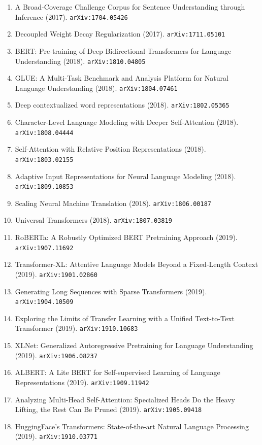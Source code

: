 \documentclass[11pt]{article}
\begin{document}
\begin{enumerate}
  \item A Broad-Coverage Challenge Corpus for Sentence Understanding through
  Inference (2017). \texttt{arXiv:1704.05426}
  \item Decoupled Weight Decay Regularization (2017). \texttt{arXiv:1711.05101}
  \item BERT: Pre-training of Deep Bidirectional Transformers for Language
  Understanding (2018). \texttt{arXiv:1810.04805}
  \item GLUE: A Multi-Task Benchmark and Analysis Platform for Natural Language
  Understanding (2018). \texttt{arXiv:1804.07461}
  \item Deep contextualized word representations (2018). \texttt{arXiv:1802.05365}
  \item Character-Level Language Modeling with Deeper Self-Attention (2018). \texttt{arXiv:1808.04444}
  \item Self-Attention with Relative Position Representations (2018). \texttt{arXiv:1803.02155}
  \item Adaptive Input Representations for Neural Language Modeling (2018). \texttt{arXiv:1809.10853}
  \item Scaling Neural Machine Translation (2018). \texttt{arXiv:1806.00187}
  \item Universal Transformers (2018). \texttt{arXiv:1807.03819}
  \item RoBERTa: A Robustly Optimized BERT Pretraining Approach (2019). \texttt{arXiv:1907.11692}
  \item Transformer-XL: Attentive Language Models Beyond a Fixed-Length Context (2019). \texttt{arXiv:1901.02860}
  \item Generating Long Sequences with Sparse Transformers (2019). \texttt{arXiv:1904.10509}
  \item Exploring the Limits of Transfer Learning with a Unified Text-to-Text
  Transformer (2019). \texttt{arXiv:1910.10683}
  \item XLNet: Generalized Autoregressive Pretraining for Language Understanding (2019). \texttt{arXiv:1906.08237}
  \item ALBERT: A Lite BERT for Self-supervised Learning of Language
  Representations (2019). \texttt{arXiv:1909.11942}
  \item Analyzing Multi-Head Self-Attention: Specialized Heads Do the Heavy
  Lifting, the Rest Can Be Pruned (2019). \texttt{arXiv:1905.09418}
  \item HuggingFace's Transformers: State-of-the-art Natural Language Processing (2019). \texttt{arXiv:1910.03771}

\end{enumerate}
\end{document}

